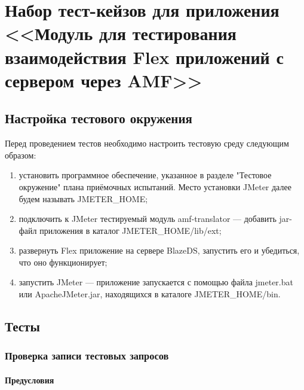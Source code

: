 \chapter{Набор тест-кейзов для приложения <<Модуль для тестирования взаимодействия Flex приложений с сервером через AMF>>}
\label{cha:appendix3}

\section{Настройка тестового окружения}

Перед проведением тестов необходимо настроить тестовую среду следующим образом:

\begin{enumerate}
\item установить программное обеспечение, указанное в разделе "Тестовое окружение" плана приёмочных испытаний.
Место установки JMeter далее будем называть JMETER\_HOME;
\item подключить к JMeter тестируемый модуль amf-translator --- добавить jar-файл приложения в каталог
JMETER\_HOME/lib/ext;
\item развернуть Flex приложение на сервере BlazeDS, запустить его и убедиться, что оно функционирует;
\item запустить JMeter --- приложение запускается с помощью файла jmeter.bat или ApacheJMeter.jar, находящихся в
каталоге JMETER\_HOME/bin.
\end{enumerate}

\section{Тесты}

\subsection{Проверка записи тестовых запросов}

\subsubsection{Предусловия}

